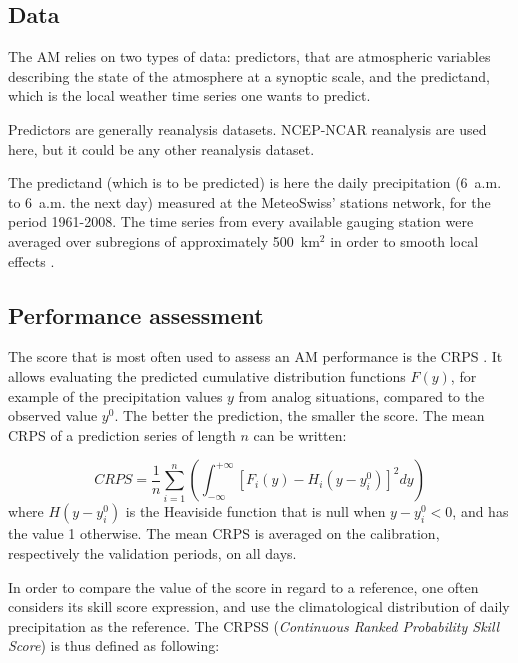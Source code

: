 \documentclass[review]{elsarticle}
\begin{document}
\subsection{Data}
\label{sec:data}

The AM relies on two types of data: predictors, that are atmospheric variables describing the state of the atmosphere at a synoptic scale, and the predictand, which is the local weather time series one wants to predict.

Predictors are generally reanalysis datasets. NCEP-NCAR reanalysis \citep[6-hourly, 17 pressure levels at a resolution of 2.5\degree, see][]{Kalnay1996} are used here, but it could be any other reanalysis dataset.

The predictand (which is to be predicted) is here the daily precipitation (6~a.m. to 6~a.m. the next day) measured at the MeteoSwiss' stations network, for the period 1961-2008. The time series from every available gauging station were averaged over subregions of approximately 500~km$^{2}$ in order to smooth local effects \citep{Obled2002, Marty2012}.


\subsection{Performance assessment}
\label{sec:score}

The score that is most often used to assess an AM performance is the CRPS \citep[Continuous Ranked Probability Score,][]{Brown1974, Matheson1976, Hersbach2000}. It allows evaluating the predicted cumulative distribution functions $F(y)$, for example of the precipitation values $y$ from analog situations, compared to the observed value $y^{0}$. The better the prediction, the smaller the score. The mean CRPS of a prediction series of length $n$ can be written:

\begin{equation}
\label{eq:CRPS}
CRPS = \frac{1}{n} \sum_{i=1}^{n} \left(  \int_{-\infty}^{+\infty} \left[ F_{i}(y)-H_{i}(y-y_{i}^{0})\right]^{2} dy \right) 
\end{equation}
where $H(y-y_{i}^{0})$ is the Heaviside function that is null when $y-y_{i}^{0}<0$, and has the value 1 otherwise. The mean CRPS is averaged on the calibration, respectively the validation periods, on all days.

In order to compare the value of the score in regard to a reference, one often considers its skill score expression, and use the climatological distribution of daily precipitation as the reference. The CRPSS (\textit{Continuous Ranked Probability Skill Score}) is thus defined as following:
\end{document}
